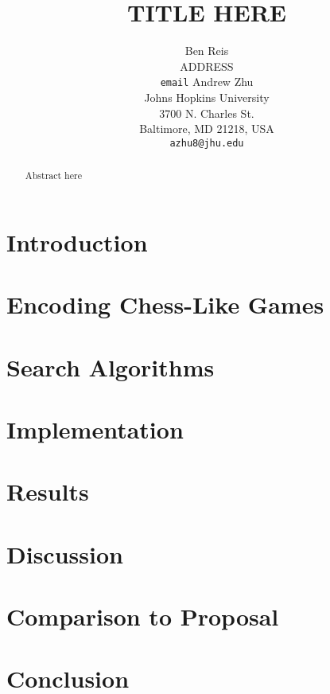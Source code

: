 \documentclass[11pt,letterpaper]{article}
\title{TITLE HERE}
\author{Ben Reis \\
  ADDRESS \\
  {\tt email}
  \And
  Andrew Zhu \\
  Johns Hopkins University \\
  3700 N. Charles St. \\
  Baltimore, MD 21218, USA\\
  {\tt azhu8@jhu.edu}}
\date{}
\begin{document}
\maketitle
\begin{abstract}
  Abstract here
\end{abstract}

\section{Introduction}


\section{Encoding Chess-Like Games}

\section{Search Algorithms}

\section{Implementation}

\section{Results}

\section{Discussion}


\section{Comparison to Proposal}


\section{Conclusion}
\end{document}
